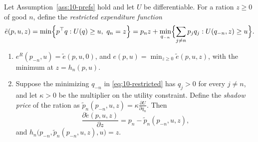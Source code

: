 \begin{lemma}\label{lem:10-restricted}
Let Assumption~\ref{ass:10-prefs} hold and let $U$ be differentiable. For a ration $z \ge 0$ of good $n$, define
the \emph{restricted expenditure function}
\begin{equation}\label{eq:10-restricted}
  \tilde e(p,u,z) = \min\Bigl\{p^\top q : U(q) \ge u,\ q_n = z\Bigr\}
  = p_nz + \min_{q_{-n}}\Bigl\{\sum_{j\neq n}p_jq_j : U(q_{-n},z) \ge u\Bigr\}.
\end{equation}
\begin{enumerate}[label=(\alph*)]
  \item $e^R(p_{-n},u) = \tilde e(p,u,0)$, and $e(p,u) = \min_{z\ge 0}\tilde e(p,u,z)$, with the minimum at
  $z = h_n(p,u)$.
  \item Suppose the minimizing $q_{-n}$ in \eqref{eq:10-restricted} has $q_j > 0$ for every $j \neq n$, and let
  $\kappa > 0$ be the multiplier on the utility constraint. Define the \emph{shadow price} of the ration as
  $\tilde p_n(p_{-n},u,z) = \kappa\frac{\partial U}{\partial q_n}$. Then
  \begin{equation}\label{eq:10-restricted-deriv}
    \frac{\partial\tilde e(p,u,z)}{\partial z} = p_n - \tilde p_n(p_{-n},u,z),
  \end{equation}
  and $h_n\bigl(p_{-n},\tilde p_n(p_{-n},u,z),u\bigr) = z$.
\end{enumerate}
\end{lemma}

